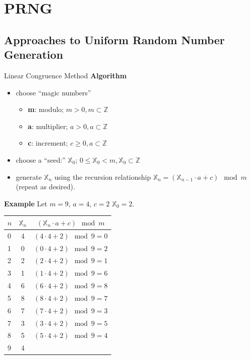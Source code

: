 \documentclass{beamer}
\begin{document}
\section{PRNG}

\subsection{Approaches to Uniform Random Number Generation}

\begin{frame}{Linear Congruence Method}
\textbf{Algorithm}
\begin{itemize}
\item choose ``magic numbers''
\begin{itemize}
\item \textbf{m}: modulo; $m > 0, m \subset \mathbb{Z}$ 
\item \textbf{a}: multiplier; $a > 0, a \subset \mathbb{Z}$
\item \textbf{c}: increment; $c \geq 0, a \subset \mathbb{Z}$
\end{itemize}
\item choose a ``seed:'' $\mathbb{X}_0$;  $0 \leq \mathbb{X}_0 < m, \mathbb{X}_0  \subset \mathbb{Z}$
\item generate $\mathbb{X}_n$ using the recursion relationship $\mathbb{X}_n = (\mathbb{X}_{n-1} \cdot a + c) \mod m$ (repeat as desired).
\end{itemize}
\end{frame}
\begin{frame}
\textbf{Example}
Let $m = 9$, $a = 4$, $c = 2$ $\mathbb{X}_0 = 2$.
\begin{table}
\centering
\begin{tabular}{l|c|c}
$n$ & $\mathbb{X}_n$ & $(\mathbb{X}_n \cdot a + c) \mod m$  \\\hline
0 & 4 & \pause $(4 \cdot 4 + 2) \mod 9 = 0$ \\
1 & 0 & \pause $(0 \cdot 4 + 2) \mod 9 = 2$ \\
2 & 2 & \pause $(2 \cdot 4 + 2) \mod 9 = 1$ \\
3 & 1 & $(1 \cdot 4 + 2) \mod 9 = 6$ \\
4 & 6 & $(6 \cdot 4 + 2) \mod 9 = 8$ \\
5 & 8 & $(8 \cdot 4 + 2) \mod 9 = 7$ \\
6 & 7 & $(7 \cdot 4 + 2) \mod 9 = 3$ \\
7 & 3 & $(3 \cdot 4 + 2) \mod 9 = 5$ \\
8 & 5 & $(5 \cdot 4 + 2) \mod 9 = 4$ \\
9 & 4 & \\
\end{tabular}
\end{table}

\end{frame}
\end{document}
